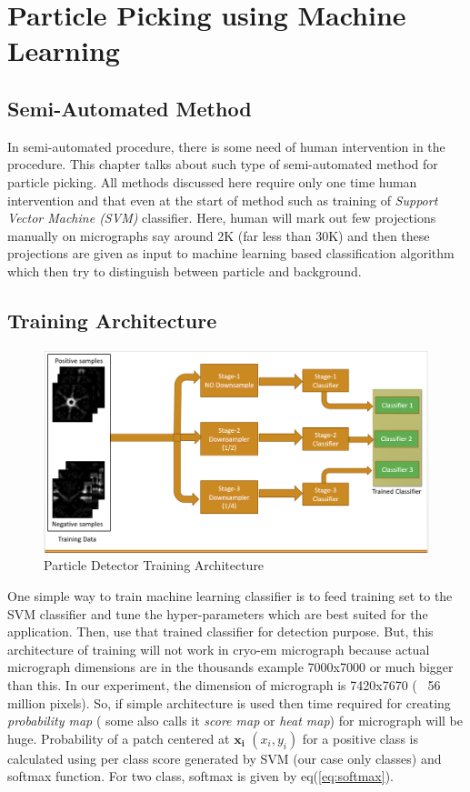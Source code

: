 \documentclass{report}
\begin{document}
\chapter{Particle Picking using Machine Learning}
\section{Semi-Automated Method}
In semi-automated procedure, there is some need of human intervention in the procedure. This chapter talks about such type of semi-automated method for particle picking. All methods discussed here require only one time human intervention and that even at the start of method such as training of \textit{Support Vector Machine (SVM)} classifier. Here, human will mark out few projections manually on micrographs say around 2K (far less than 30K) and then these projections are given as input to machine learning based classification algorithm which then try to distinguish between particle and background.


\section{Training Architecture}\label{sec:train_arch}

\begin{figure}[H]
\includegraphics[width=1\textwidth]{train_arch}
\centering
\captionsetup{justification=centering}
\caption{Particle Detector Training Architecture}
\label{fig:training_arch}
\end{figure}

One simple way to train machine learning classifier is to feed training set to the SVM classifier and tune the hyper-parameters which are best suited for the application. Then, use that trained classifier for detection purpose. But, this architecture of training will not work in cryo-em  micrograph because actual micrograph dimensions are in the thousands example 7000x7000 or much bigger than this. In our experiment, the dimension of micrograph is 7420x7670 (~ 56 million pixels). So, if simple architecture is used then time required for creating \textit{probability map} ( some also calls it \textit{score map} or \textit{heat map}) for micrograph will be huge. Probability of a patch centered at $\boldsymbol{x_i}$ $(x_i,y_i)$ for a positive class is calculated using per class score generated by SVM  (our case only classes) and softmax function. For two class, softmax is given by eq(\ref{eq:softmax}).
\end{document}
